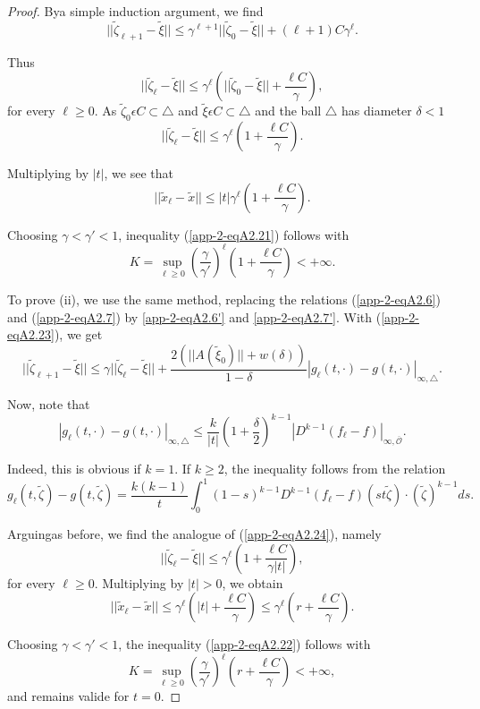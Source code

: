 \begin{proof}
By\pageoriginale a simple induction argument, we find
$$
||\widetilde{\zeta}_{\ell + 1} - \widetilde{\xi}|| \leq \gamma^{\ell +
1} ||\widetilde{\zeta}_{0} - \widetilde{\xi}|| + (\ell + 1) C\gamma^{\ell}.
$$

Thus
$$
||\widetilde{\zeta}_{\ell} - \widetilde{\xi}|| \leq \gamma^{\ell}
\left(||\widetilde{\zeta}_{0} - \widetilde{\xi}|| + \frac{\ell C}{\gamma}\right),
$$
for every $\ell \geq 0$. As $\widetilde{\zeta}_{0} \epsilon C \subset
\triangle$ and $\widetilde{\xi} \epsilon C \subset \triangle$ and the
ball $\triangle$ has diameter $\delta < 1$
\begin{equation*}
||\widetilde{\zeta}_{\ell} - \widetilde{\xi}|| \leq \gamma^{\ell} \left(1 +
\frac{\ell C}{\gamma}\right).\tag{A2.24}\label{app-2-eqA2.24}
\end{equation*}

Multiplying by $|t|$, we see that
$$
||\widetilde{x}_{\ell} - \widetilde{x}|| \leq |t| \gamma^{\ell}
\left(1 + \frac{\ell C}{\gamma}\right).
$$

Choosing $\gamma < \gamma' < 1$, inequality (\ref{app-2-eqA2.21}) follows with
$$
K = \sup_{\ell \geq 0} \left(\frac{\gamma}{\gamma'}\right)^{\ell}
\left(1 + \frac{\ell C}{\gamma}\right) < + \infty.
$$

To prove (ii), we use the same method, replacing the relations (\ref{app-2-eqA2.6}) and (\ref{app-2-eqA2.7}) by \ref{app-2-eqA2.6'} and \ref{app-2-eqA2.7'}. With (\ref{app-2-eqA2.23}), we get
$$
||\widetilde{\zeta}_{\ell + 1} - \widetilde{\xi}|| \leq \gamma
||\widetilde{\zeta}_{\ell} - \widetilde{\xi}|| +
\frac{2(||A(\widetilde{\xi}_{0})|| + w(\delta))}{1 - \delta} |g_{\ell}
(t, \cdot) - g(t, \cdot)|_{\infty, \triangle}.
$$

Now, note that
$$
|g_{\ell} (t, \cdot) - g(t, \cdot)|_{\infty, \triangle} \leq
\frac{k}{|t|} \left(1 + \frac{\delta}{2}\right)^{k-1} |D^{k-1}
(f_{\ell} - f)|_{\infty, \overline{\mathscr{O}}}.
$$

Indeed, this is obvious if $k = 1$. If $k \geq 2$, the inequality
follows from the relation
$$
g_{\ell}(t, \widetilde{\zeta}) - g(t, \widetilde{\zeta}) = \frac{k(k -
  1)}{t} \int_{0}^{1} (1 - s)^{k-1} D^{k-1} (f_{\ell} - f)(st
\widetilde{\zeta}) \cdot (\widetilde{\zeta})^{k-1} ds.
$$

Arguing\pageoriginale as before, we find the analogue of (\ref{app-2-eqA2.24}),
namely
$$
||\widetilde{\zeta}_{\ell} - \widetilde{\xi}|| \leq \gamma^{\ell} \left(1 +
 \frac{\ell C}{\gamma |t|}\right),
$$
for every $\ell \geq 0$. Multiplying by $|t| > 0$, we obtain
$$
||\widetilde{x}_{\ell} - \widetilde{x}|| \leq \gamma^{\ell} \left(|t|
+ \frac{\ell C}{\gamma}\right) \leq \gamma^{\ell} \left(r + \frac{\ell
  C}{\gamma}\right). 
$$

Choosing $\gamma < \gamma' < 1$, the inequality (\ref{app-2-eqA2.22}) follows with
$$
K = \sup_{\ell \geq 0} \left(\frac{\gamma}{\gamma'}\right)^{\ell}
\left(r + \frac{\ell C}{\gamma}\right) < + \infty,
$$
and remains valide for $t = 0$.
\end{proof}

